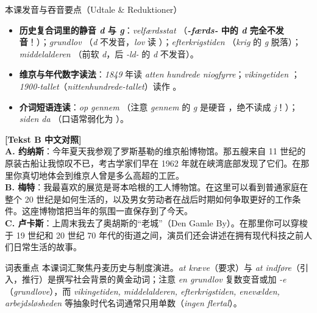 \begin{tipbox}{本课发音与吞音要点（Udtale \& Reduktioner）}
\begin{itemize}
  \item \textbf{历史复合词里的静音 \textit{d} 与 \textit{g}}：\textit{velfærdsstat} （\textbf{\textit{-færds-} 中的 \textit{d} 完全不发音}！）；\textit{grundlov} （\textit{d} 不发音，\textit{lov} 读 ）；\textit{efterkrigstiden} （\textit{krig} 的 \textit{g} 脱落）；\textit{middelalderen} （前软 \textit{d}，后 \textit{-ld-} 的 \textit{d} 不发音）。
  \item \textbf{维京与年代数字读法}：\textit{1849} 年读 \textit{atten hundrede niogfyrre}；\textit{vikingetiden} ；\textit{1900-tallet}（\textit{nittenhundrede-tallet}）读作 。
  \item \textbf{介词短语连读}：\textit{op gennem} （注意 \textit{gennem} 的 \textit{g} 是硬音 ，绝不读成 \textit{j}！）；\textit{siden da} （口语常弱化为 ）。
\end{itemize}
\end{tipbox}

\begin{transbox}
\small
\textbf{\color{NCDTeal}[Tekst B 中文对照]}\\
\textbf{A. 约纳斯}：今年夏天我参观了罗斯基勒的维京船博物馆。那五艘来自 11 世纪的原装古船让我惊叹不已，考古学家们早在 1962 年就在峡湾底部发现了它们。在那里你真切地体会到维京人曾是多么高超的工匠。\\
\textbf{B. 梅特}：我最喜欢的展览是哥本哈根的工人博物馆。在这里可以看到普通家庭在整个 20 世纪是如何生活的，以及男女劳动者在战后时期如何争取更好的工作条件。这座博物馆把当年的氛围一直保存到了今天。\\
\textbf{C. 卢卡斯}：上周末我去了奥胡斯的“老城”（Den Gamle By）。在那里你可以穿梭于 19 世纪和 20 世纪 70 年代的街道之间，演员们还会讲述在拥有现代科技之前人们日常生活的故事。
\end{transbox}


\begin{tipbox}{词表重点}
本课词汇聚焦丹麦历史与制度演进。\textit{at kræve}（要求）与 \textit{at indføre}（引入，推行）是撰写社会背景的黄金动词；注意 \textit{en grundlov} 复数变音或加 \textit{-e}（\textit{grundlove}），而 \textit{vikingetiden, middelalderen, efterkrigstiden, enevælden, arbejdsløsheden} 等抽象时代名词通常只用单数（\textit{ingen flertal}）。
\end{tipbox}

